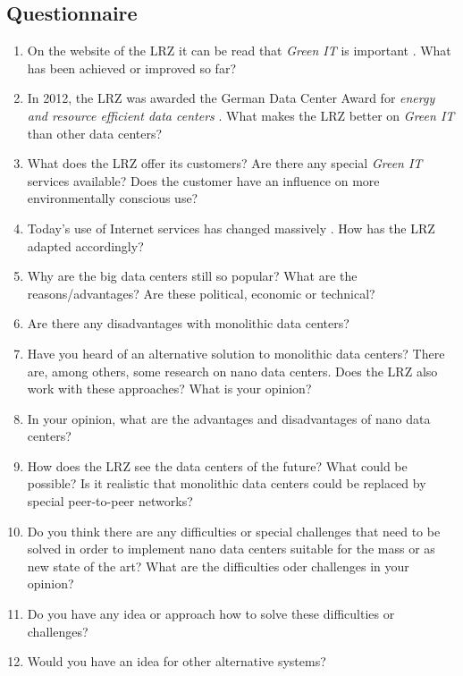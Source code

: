\documentclass[sigchi-a, authorversion]{acmart}
\begin{document}
\begin{appendices}
\chapter{Questionnaire}
\begin{enumerate}
\label{appendix:quest}
\item On the website of the LRZ it can be read that \textit{Green IT} is important \cite{LRZGreenIT}. What has been achieved or improved so far?
\item In 2012, the LRZ was awarded the German Data Center Award for \textit{energy and resource efficient data centers} \cite{LRZGreenIT}. What makes the LRZ better on \textit{Green IT} than other data centers?
\item What does the LRZ offer its customers? Are there any special \textit{Green IT} services available? Does the customer have an influence on more environmentally conscious use?
\item Today's use of Internet services has changed massively \cite{TheZetta68:online}. How has the LRZ adapted accordingly?
\item Why are the big data centers still so popular? What are the reasons/advantages? Are these political, economic or technical?
\item Are there any disadvantages with monolithic data centers?
\item Have you heard of an alternative solution to monolithic data centers? There are, among others, some research on nano data centers. Does the LRZ also work with these approaches? What is your opinion?
\item In your opinion, what are the advantages and disadvantages of nano data centers?
\item How does the LRZ see the data centers of the future? What could be possible? Is it realistic that monolithic data centers could be replaced by special peer-to-peer networks?
\item Do you think there are any difficulties or special challenges that need to be solved in order to implement nano data centers suitable for the mass or as new state of the art? What are the difficulties oder challenges in your opinion?
\item Do you have any idea or approach how to solve these difficulties or challenges?
\item Would you have an idea for other alternative systems?
\end{enumerate}
\end{appendices}
\end{document}
